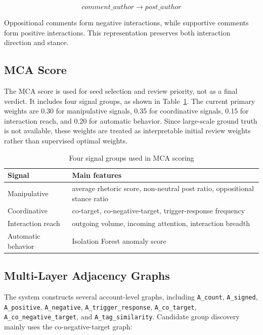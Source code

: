 \documentclass[conference]{IEEEtran}
\begin{document}
\begin{equation}
comment\_author \rightarrow post\_author
\end{equation}

Oppositional comments form negative interactions, while supportive comments form positive interactions. This representation preserves both interaction direction and stance.

\subsection{MCA Score}

The MCA score is used for seed selection and review priority, not as a final verdict. It includes four signal groups, as shown in Table~\ref{tab:mca-signals-en}. The current primary weights are 0.30 for manipulative signals, 0.35 for coordinative signals, 0.15 for interaction reach, and 0.20 for automatic behavior. Since large-scale ground truth is not available, these weights are treated as interpretable initial review weights rather than supervised optimal weights.

\begin{table}[htbp]
\centering
\caption{Four signal groups used in MCA scoring}
\label{tab:mca-signals-en}
\small
\begin{tabular}{p{}p{}}
\toprule
Signal & Main features \\
\midrule
Manipulative & average rhetoric score, non-neutral post ratio, oppositional stance ratio \\
Coordinative & co-target, co-negative-target, trigger-response frequency \\
Interaction reach & outgoing volume, incoming attention, interaction breadth \\
Automatic behavior & Isolation Forest anomaly score \\
\bottomrule
\end{tabular}
\end{table}

\subsection{Multi-Layer Adjacency Graphs}

The system constructs several account-level graphs, including \texttt{A\_count}, \texttt{A\_signed}, \texttt{A\_positive}, \texttt{A\_negative}, \texttt{A\_trigger\_response}, \texttt{A\_co\_target}, \texttt{A\_co\_negative\_target}, and \texttt{A\_tag\_similarity}. Candidate group discovery mainly uses the co-negative-target graph:
\end{document}
